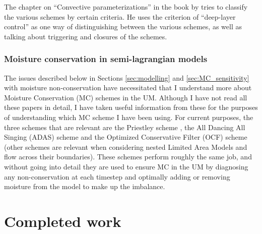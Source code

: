 \documentclass[11pt,a4paper]{article}
\begin{document}
The chapter on ``Convective parameterizations'' in the book by \cite{stensrud2009parameterization} tries to classify the various schemes by certain criteria. He uses the criterion of ``deep-layer control'' as one way of distinguishing between the various schemes, as well as talking about triggering and closures of the schemes.


\subsubsection{Moisture conservation in semi-lagrangian models}
\label{sec:MC_in_SL}
The issues described below in Sections \ref{sec:modelling} and \ref{sec:MC_sensitivity} with moisture non-conservation have necessitated that I understand more about Moisture Conservation (MC) schemes in the UM. Although I have not read all these papers in detail, I have taken useful information from these for the purposes of understanding which MC scheme I have been using. For current purposes, the three schemes that are relevant are the Priestley scheme \parencite{priestley1993quasi}, the All Dancing All Singing (ADAS) scheme \parencite{zerroukat2010simple} and the Optimized Conservative Filter (OCF) scheme \parencite{zerroukat2015monotonic} (other schemes are relevant when considering nested Limited Area Models and flow across their boundaries). These schemes perform roughly the same job, and without going into detail they are used to ensure MC in the UM by diagnosing any non-conservation at each timestep and optimally adding or removing moisture from the model to make up the imbalance.


\section{Completed work}
\end{document}
